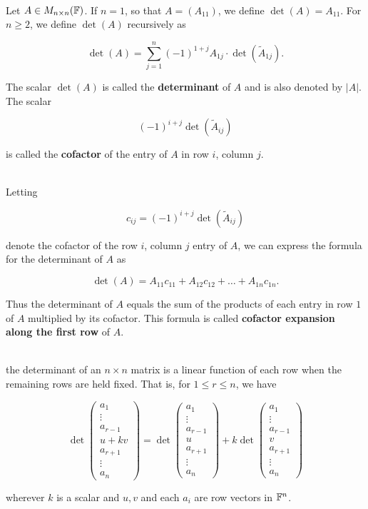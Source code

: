 \begin{definition}
	\hfill\\
	Let $A \in M_{n \times n}(\mathbb{F})$. If $n =1$, so that $A = (A_{11})$, we define $\det(A) = A_{11}$. For $n \geq 2$, we define $\det(A)$ recursively as

	\[\det(A) = \sum_{j=1}^{n}(-1)^{1+j}A_{1j}\cdot\det(\tilde{A}_{1j}).\]

	The scalar $\det(A)$ is called the \textbf{determinant} of $A$ and is also denoted by $|A|$. The scalar

	\[(-1)^{i+j}\det(\tilde{A}_{ij})\]

	is called the \textbf{cofactor} of the entry of $A$ in row $i$, column $j$.
\end{definition}

\begin{definition}
	\hfill\\
	Letting

	\[c_{ij} = (-1)^{i+j}\det(\tilde{A}_{ij})\]

	denote the cofactor of the row $i$, column $j$ entry of $A$, we can express the formula for the determinant of $A$ as

	\[\det(A) = A_{11}c_{11} + A_{12}c_{12}+\dots+A_{1n}c_{1n}.\]

	Thus the determinant of $A$ equals the sum of the products of each entry in row $1$ of $A$ multiplied by its cofactor. This formula is called \textbf{cofactor expansion along the first row} of $A$.
\end{definition}

\begin{theorem}
	\hfill\\
	the determinant of an $n \times n$ matrix is a linear function of each row when the remaining rows are held fixed. That is, for $1 \leq r \leq n$, we have

	\[\det\begin{pmatrix}
			a_1 \\ \vdots \\ a_{r-1} \\ u+kv \\ a_{r+1} \\ \vdots \\ a_n
		\end{pmatrix}=\det\begin{pmatrix}
			a_1 \\ \vdots \\ a_{r-1} \\ u \\ a_{r+1} \\ \vdots \\ a_n
		\end{pmatrix} + k\det\begin{pmatrix}
			a_1 \\ \vdots \\ a_{r-1} \\ v \\ a_{r+1} \\ \vdots \\ a_n
		\end{pmatrix}\]

	wherever $k$ is a scalar and $u, v$ and each $a_i$ are row vectors in $\mathbb{F}^n$.
\end{theorem}

